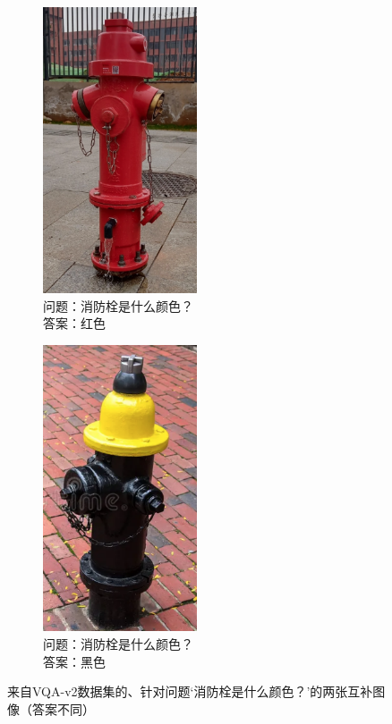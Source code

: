 \begin{figure}[htbp]
    \centering
    \begin{subfigure}[b]{0.45\textwidth}
        \centering
        \includegraphics[width=0.5\textwidth, keepaspectratio]{figures/hydrant-a.png}
        \caption*{\footnotesize 问题：消防栓是什么颜色？\\答案：红色}
        \label{fig:example-from-vqa-v2-1}
    \end{subfigure}
    \hfill
    \begin{subfigure}[b]{0.45\textwidth}
        \centering
        \includegraphics[width=0.5\textwidth, keepaspectratio]{figures/hydrant-b.png}
        \caption*{\footnotesize 问题：消防栓是什么颜色？\\答案：黑色}
        \label{fig:example-from-vqa-v2-2}
    \end{subfigure}
    \caption{来自VQA-v2数据集的、针对问题‘消防栓是什么颜色？’的两张互补图像（答案不同）}
    \label{fig:example-from-vqa-v2}
\end{figure}

